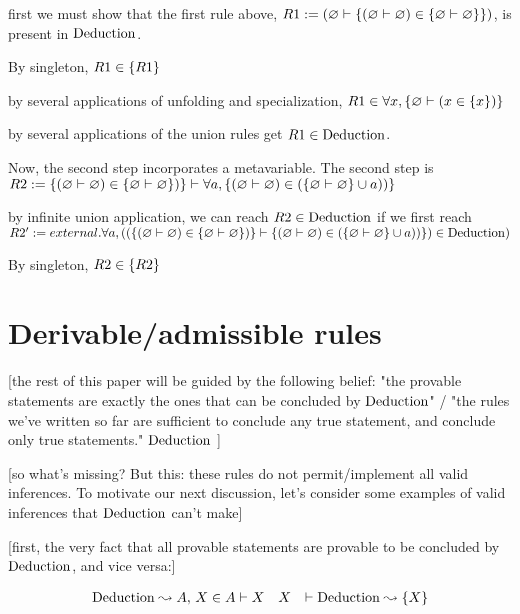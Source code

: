 \documentclass{article}
\begin{document}
  first we must show that the first rule above, $R1 := (\varnothing \vdash \{(\varnothing \vdash \varnothing) \in \{\varnothing \vdash \varnothing\}\}) $, is present in $\operatorname{\mathrm{Deduction}}$.
  
  By singleton, $R1 \in \{R1\}$
  
  by several applications of unfolding and specialization, $R1 \in \forall x, \{\varnothing \vdash (x \in \{x\})\}$
  
  by several applications of the union rules get $R1 \in \operatorname{\mathrm{Deduction}}$.
  
  Now, the second step incorporates a metavariable. The second step is $R2 := \{(\varnothing \vdash \varnothing) \in \{\varnothing \vdash \varnothing\})\} \vdash \forall a, \{(\varnothing \vdash \varnothing) \in (\{\varnothing \vdash \varnothing\} \cup a))\} $  
  
  by infinite union application, we can reach $R2 \in \operatorname{\mathrm{Deduction}} $ if we first reach $ R2' := external.\forall a, ((\{(\varnothing \vdash \varnothing) \in \{\varnothing \vdash \varnothing\})\} \vdash \{(\varnothing \vdash \varnothing) \in (\{\varnothing \vdash \varnothing\} \cup a))\}) \in \operatorname{\mathrm{Deduction}}) $
  
  By singleton, $R2 \in \{R2\}$

  
  
  \section{Derivable/admissible rules}

  [the rest of this paper will be guided by the following belief: "the provable statements are exactly the ones that can be concluded by $\operatorname{\mathrm{Deduction}}$" / "the rules we've written so far are sufficient to conclude any true statement, and conclude only true statements." $\operatorname{\mathrm{Deduction}}$ ]
  
  [so what's missing? But this: these rules do not permit/implement all valid inferences. To motivate our next discussion, let's consider some examples of valid inferences that $\operatorname{\mathrm{Deduction}}$ can't make]
  
  [first, the very fact that all provable statements are provable to be concluded by $\operatorname{\mathrm{Deduction}}$, and vice versa:]
  
  \begin{align*}
    \operatorname{\mathrm{Deduction}} \leadsto A ,\, X \in A &\vdash X && 
    X &\vdash \operatorname{\mathrm{Deduction}} \leadsto \{X\}
  \end{align*}
  
\end{document}
